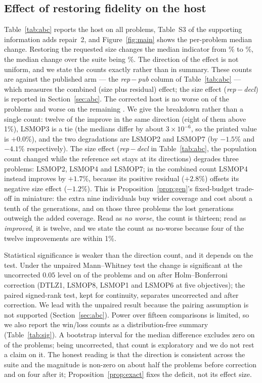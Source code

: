 \documentclass{SCIS2026}
\begin{document}
\subsection{Effect of restoring fidelity on the host}
\label{sec:effect}
Table~\ref{tab:abc} reports the host on all \nProbs{} problems, Table~S3 of the supporting information adds repair~2, and Figure~\ref{fig:main} shows the per-problem median change. Restoring the requested size changes the median indicator from \fixMinGain\% to \fixMaxGain\%, the median change over the suite being \fixMedGain\%. The direction of the effect is not uniform, and we state the counts exactly rather than in summary. These counts are against the published arm --- the \emph{rep\,$-$\,pub} column of Table~\ref{tab:abc} --- which measures the combined (size plus residual) effect; the size effect (\emph{rep\,$-$\,decl}) is reported in Section~\ref{sec:abc}. The corrected host is no worse on \fixNoWorseN{} of the \nProbs{} problems and worse on the remaining \fixWorseN{}. We give the breakdown rather than a single count: twelve of the \fixNoWorseN{} improve in the same direction (eight of them above 1\%), LSMOP3 is a tie (the medians differ by about $3\times10^{-6}$, so the printed value is $+0.0\%$), and the two degradations are LSMOP2 and LSMOP7 (by $-1.5\%$ and $-4.1\%$ respectively). The size effect (\emph{rep\,$-$\,decl} in Table~\ref{tab:abc}, the population count changed while the reference set stays at its \retMthree{} directions) degrades three problems: LSMOP2, LSMOP4 and LSMOP7; in the combined count LSMOP4 instead improves by $+1.7\%$, because its positive residual ($+2.8\%$) offsets its negative size effect ($-1.2\%$). This is Proposition~\ref{prop:gen}'s fixed-budget trade-off in miniature: the extra nine individuals buy wider coverage and cost about a tenth of the generations, and on those three problems the lost generations outweigh the added coverage. Read as \emph{no worse}, the count is thirteen; read as \emph{improved}, it is twelve, and we state the count as no-worse because four of the twelve improvements are within 1\%.

Statistical significance is weaker than the direction count, and it depends on the test. Under the unpaired Mann--Whitney test the change is significant at the uncorrected $0.05$ level on \newUnpairedSig{} of the \nProbs{} problems and on \newUnpairedHolm{} after Holm--Bonferroni correction (DTLZ1, LSMOP8, LSMOP1 and LSMOP6 at five objectives); the paired signed-rank test, kept for continuity, separates \fixSigCount{} uncorrected and \fixSigHolm{} after correction. We lead with the unpaired result because the pairing assumption is not supported (Section~\ref{sec:abc}). Power over fifteen comparisons is limited, so we also report the win/loss counts as a distribution-free summary (Table~\ref{tab:sig}). A bootstrap interval for the median difference excludes zero on \ciExclN{} of the problems; being uncorrected, that count is exploratory and we do not rest a claim on it. The honest reading is that the direction is consistent across the suite and the magnitude is non-zero on about half the problems before correction and on four after it; Proposition~\ref{prop:exact} fixes the deficit, not its effect size.
\end{document}
